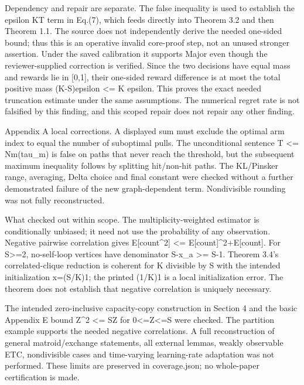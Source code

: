 \documentclass[10pt]{article}
\begin{document}
Dependency and repair are separate. The false inequality is used to establish the epsilon KT term in Eq.(7), which feeds directly into Theorem 3.2 and then Theorem 1.1. The source does not independently derive the needed one-sided bound; thus this is an operative invalid core-proof step, not an unused stronger assertion. Under the saved calibration it supports Major even though the reviewer-supplied correction is verified. Since the two decisions have equal mass and rewards lie in [0,1], their one-sided reward difference is at most the total positive mass (K-S)epsilon <= K epsilon. This proves the exact needed truncation estimate under the same assumptions. The numerical regret rate is not falsified by this finding, and this scoped repair does not repair any other finding.\par
Appendix A local corrections. A displayed sum must exclude the optimal arm index to equal the number of suboptimal pulls. The unconditional sentence T <= Nm(tau\_m) is false on paths that never reach the threshold, but the subsequent maximum inequality follows by splitting hit/non-hit paths. The KL/Pinsker range, averaging, Delta choice and final constant were checked without a further demonstrated failure of the new graph-dependent term. Nondivisible rounding was not fully reconstructed.\par
What checked out within scope. The multiplicity-weighted estimator is conditionally unbiased; it need not use the probability of any observation. Negative pairwise correlation gives E[count\textasciicircum{}2] <= E[count]\textasciicircum{}2+E[count]. For S>=2, no-self-loop vertices have denominator S-x\_a >= S-1. Theorem 3.4’s correlated-clique reduction is coherent for K divisible by S with the intended initialization x=(S/K)1; the printed (1/K)1 is a local initialization error. The theorem does not establish that negative correlation is uniquely necessary.\par
The intended zero-inclusive capacity-copy construction in Section 4 and the basic Appendix E bound Z\textasciicircum{}2 <= SZ for 0<=Z<=S were checked. The partition example supports the needed negative correlations. A full reconstruction of general matroid/exchange statements, all external lemmas, weakly observable ETC, nondivisible cases and time-varying learning-rate adaptation was not performed. These limits are preserved in coverage.json; no whole-paper certification is made.\par
\end{document}
